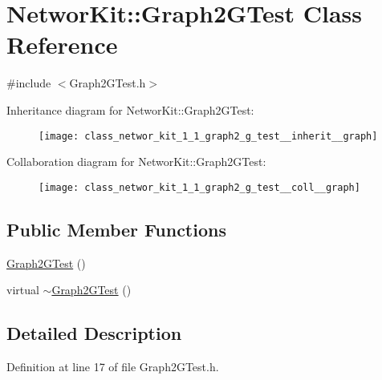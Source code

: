 \hypertarget{class_networ_kit_1_1_graph2_g_test}{\section{Networ\-Kit\-:\-:Graph2\-G\-Test Class Reference}
\label{class_networ_kit_1_1_graph2_g_test}
}


{\ttfamily \#include $<$Graph2\-G\-Test.\-h$>$}



Inheritance diagram for Networ\-Kit\-:\-:Graph2\-G\-Test\-:\nopagebreak
\begin{figure}[H]
\begin{center}
\leavevmode
\texttt{[image: class\_networ\_kit\_1\_1\_graph2\_g\_test\_\_inherit\_\_graph]}
\end{center}
\end{figure}


Collaboration diagram for Networ\-Kit\-:\-:Graph2\-G\-Test\-:\nopagebreak
\begin{figure}[H]
\begin{center}
\leavevmode
\texttt{[image: class\_networ\_kit\_1\_1\_graph2\_g\_test\_\_coll\_\_graph]}
\end{center}
\end{figure}
\subsection*{Public Member Functions}
\begin{DoxyCompactItemize}
\item 
\hyperlink{class_networ_kit_1_1_graph2_g_test_a4f696e1a124611bf84a4fd182294b40a}{Graph2\-G\-Test} ()
\item 
virtual \hyperlink{class_networ_kit_1_1_graph2_g_test_a6f0d168efe895463ef35839f86c5b241}{$\sim$\-Graph2\-G\-Test} ()
\end{DoxyCompactItemize}


\subsection{Detailed Description}


Definition at line 17 of file Graph2\-G\-Test.\-h.



